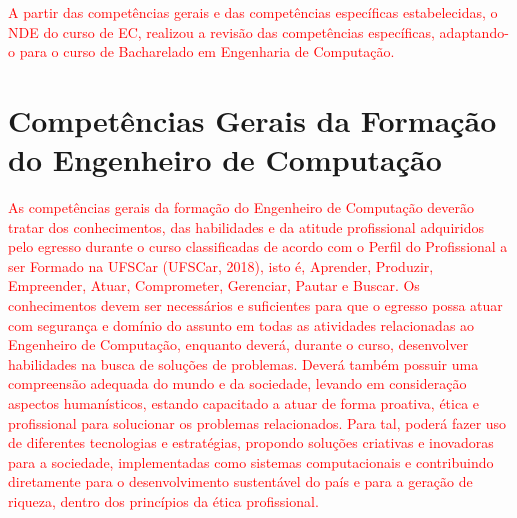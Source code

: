 \textcolor{red}{A partir das competências gerais e das competências específicas estabelecidas, o NDE do curso de EC, realizou a revisão das competências específicas, adaptando-o para o curso de Bacharelado em Engenharia de Computação.}




\section{Competências Gerais da Formação do Engenheiro de Computação}\label{sec:competencias-gerais-da-formacao-do-engenheiro-de-computacao}

\textcolor{red}{As competências gerais da formação do Engenheiro de Computação deverão tratar dos conhecimentos, das habilidades e da atitude profissional adquiridos pelo egresso durante o curso classificadas de acordo com o Perfil do Profissional a ser Formado na UFSCar (UFSCar, 2018), isto é, Aprender, Produzir, Empreender, Atuar, Comprometer, Gerenciar, Pautar e Buscar. Os conhecimentos devem ser necessários e suficientes para que o egresso possa atuar com segurança e domínio do assunto em todas as atividades relacionadas ao Engenheiro de Computação, enquanto deverá, durante o curso, desenvolver habilidades na busca de soluções de problemas. Deverá também possuir uma compreensão adequada do mundo e da sociedade, levando em consideração aspectos humanísticos, estando capacitado a atuar de forma proativa, ética e profissional para solucionar os problemas relacionados.}
\textcolor{red}{Para tal, poderá fazer uso de diferentes tecnologias e estratégias, propondo soluções criativas e inovadoras para a sociedade, implementadas como sistemas computacionais e contribuindo diretamente para o desenvolvimento sustentável do país e para a geração de riqueza, dentro dos princípios da ética profissional.}

